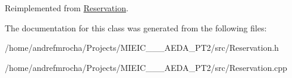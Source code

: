 Reimplemented from \mbox{\hyperlink{class_reservation_a8ec83fe2eb15294c3a51a9998ed17df7}{Reservation}}.



The documentation for this class was generated from the following files\+:\begin{DoxyCompactItemize}
\item 
/home/andrefmrocha/\+Projects/\+M\+I\+E\+I\+C\+\_\+\_\+\_\+\+A\+E\+D\+A\+\_\+\+P\+T2/src/Reservation.\+h\item 
/home/andrefmrocha/\+Projects/\+M\+I\+E\+I\+C\+\_\+\_\+\_\+\+A\+E\+D\+A\+\_\+\+P\+T2/src/Reservation.\+cpp\end{DoxyCompactItemize}
